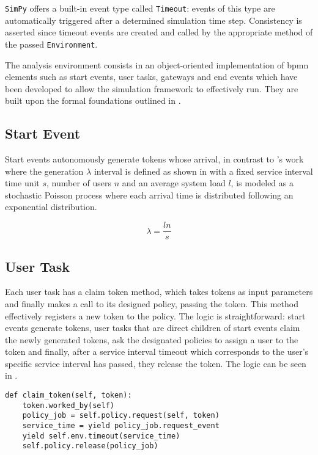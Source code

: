 \texttt{SimPy} offers a built-in event type called \texttt{Timeout}: events of this type are automatically triggered after a determined simulation time step. Consistency is asserted since timeout events are created and called by the appropriate method of the passed \texttt{Environment}.

The analysis environment consists in an object-oriented implementation of \gls{bpmn} elements such as start events, user tasks, gateways and end events which have been developed to allow the simulation framework to effectively run. They are built upon the formal foundations outlined in .

\subsection{Start Event}
\label{subsec:start_event}

Start events autonomously generate tokens whose arrival, in contrast to \citet{Zeng2005}'s work where the generation $\lambda$ interval is defined as shown in  with a fixed service interval time unit $s$, number of users $n$ and an average system load $l$, is modeled as a stochastic Poisson process where each arrival time is distributed following an exponential distribution. 

\begin{equation}
\label{eq:generation_interval}
	\lambda = \frac{l n}{s}
\end{equation}

\subsection{User Task}
\label{subsec:user_task}

Each user task has a claim token method, which takes tokens as input parameters and finally makes a call to its designed policy, passing the token. This method effectively registers a new token to the policy. The logic is straightforward: start events generate tokens, user tasks that are direct children of start events claim the newly generated tokens, ask the designated policies to assign a user to the token and finally, after a service interval timeout which corresponds to the user's specific service interval has passed, they release the token. The logic can be seen in .

\begin{lstlisting}[caption={User task claim method where a call to the corresponding policy request method is made. The policy performs role resolution effectively mapping a token to a user and returns the user's service time which is then yielded as a timeout in the discrete event simulation environment. When this time has elapsed, the policy releases the user.},label=lst:user_task,style=CustomPython]
def claim_token(self, token):
    token.worked_by(self)
    policy_job = self.policy.request(self, token)
    service_time = yield policy_job.request_event
    yield self.env.timeout(service_time)
    self.policy.release(policy_job)
\end{lstlisting}

